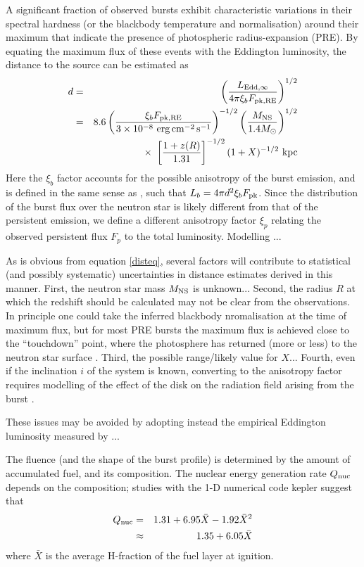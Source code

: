 \documentclass{aastex61}
\newcommand{\epcs}{{\rm erg\,cm^{-2}\,s^{-1}}}
\begin{document}
A significant fraction of observed bursts exhibit characteristic variations in their spectral hardness (or the blackbody temperature and normalisation) around their maximum that indicate the presence of photospheric radius-expansion (PRE). By equating the maximum flux of these events with the Eddington luminosity, the distance to the source can be estimated as
\begin{eqnarray}
 d & = & \left(\frac{L_{\rm Edd,\infty}}{4\pi \xi_b F_{\rm pk, RE}}\right)^{1/2} \nonumber \\
   & = & 8.6
	\left( \frac{\xi_b F_{\rm pk, RE}}{3\times10^{-8}\ \epcs} \right)^{-1/2}
       	\left(\frac{M_{\rm NS}}{1.4M_\odot}\right)^{1/2}
\nonumber \\ & & \times\  %
	\left[\frac{1+z(R)}{1.31}\right]^{-1/2}
	(1+X)^{-1/2}\ {\rm kpc}
 \label{disteq}
\end{eqnarray}
% 
Here the $\xi_b$ factor accounts for the possible anisotropy of the burst emission, and is defined in the same sense as \citep{fuji88}, such that $L_b=4\pi d^2\xi_b F_{\rm pk}$. Since the distribution of the burst flux over the neutron star is likely different from that of the persistent emission, we define a different anisotropy factor $\xi_p$ relating the observed persistent flux $F_p$ to the total luminosity. Modelling \cite[]{he16}...

As is obvious from equation \ref{disteq}, several factors will contribute to statistical (and possibly systematic) uncertainties in distance estimates derived in this manner. First, the neutron star mass $M_{\rm NS}$ is unknown...
%
Second, the radius $R$ at which the redshift should be calculated may not be clear from the observations. In principle one could take the inferred blackbody nromalisation at the time of maximum flux, but for most PRE bursts the maximum flux is achieved close to the ``touchdown'' point, where the photosphere has returned (more or less) to the neutron star surface \cite[e.g.][]{gal06a}.
%
Third, the possible range/likely value for $X$...
%
Fourth, even if the inclination $i$ of the system is known, converting to the anisotropy factor requires modelling of the effect of the disk on the radiation field arising from the burst \cite[e.g.][]{he16}.

These issues may be avoided by adopting instead the empirical Eddington luminosity measured by \cite[]{kuul03a}...

The fluence (and the shape of the burst profile) is determined by the amount of accumulated fuel, and its composition. The nuclear energy generation rate $Q_{\rm nuc}$ depends on the composition; studies with the 1-D numerical code {\sc kepler} suggest that 
\begin{eqnarray}
Q_{\rm nuc} &= & 1.31+6.95\bar{X}-1.92\bar{X}^2 \nonumber \\
& \approx & 1.35 + 6.05 \bar{X}
\end{eqnarray}
\cite[]{goodwin19a} where $\bar{X}$ is the average H-fraction of the fuel layer at ignition.
\end{document}
